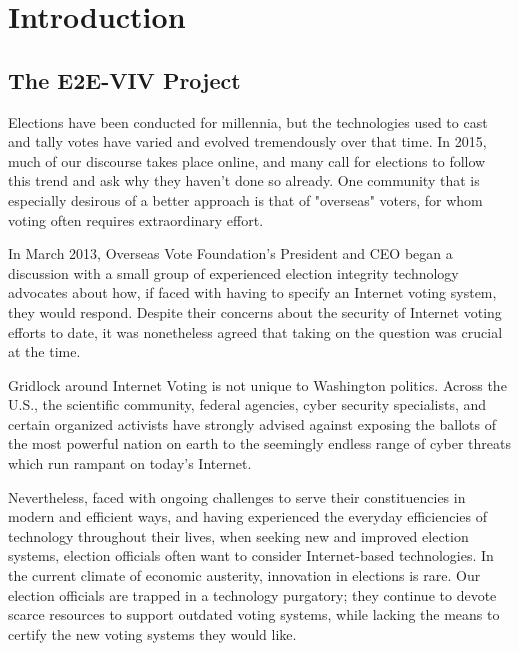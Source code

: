 \chapter{Introduction}
\label{chapter:introduction}

\section{The E2E-VIV Project}
\label{sec:e2e-viv-project}


Elections have been conducted for millennia, but the technologies used
to cast and tally votes have varied and evolved tremendously over that
time. In 2015, much of our discourse takes place online, and many 
call for elections to follow this trend and ask why they haven't
done so already. One community that is especially desirous of a better
approach is that of "overseas" voters, for whom voting often requires
extraordinary effort.

In March 2013, Overseas Vote Foundation’s President and CEO began a
discussion with a small group of experienced election integrity
technology advocates about how, if faced with having to specify an
Internet voting system, they would respond. Despite their concerns
about the security of Internet voting efforts to date, it was
nonetheless agreed that taking on the question was crucial at the
time.

Gridlock around Internet Voting is not unique to Washington
politics. Across the U.S., the scientific community, federal agencies,
cyber security specialists, and certain organized activists have
strongly advised against exposing the ballots of the most powerful
nation on earth to the seemingly endless range of cyber threats which
run rampant on today’s Internet.

Nevertheless, faced with ongoing challenges to serve their
constituencies in modern and efficient ways, and having experienced
the everyday efficiencies of technology throughout their lives, when
seeking new and improved election systems, election officials often
want to consider Internet-based technologies. In the current climate
of economic austerity, innovation in elections is rare. Our election
officials are trapped in a technology purgatory; they continue to
devote scarce resources to support outdated voting systems, while
lacking the means to certify the new voting systems they would like.

